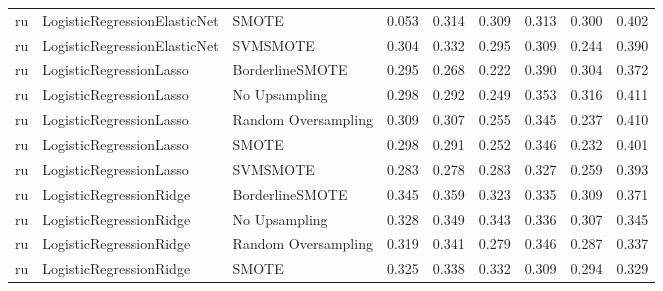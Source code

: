 \begin{tabular}{lllllllll}
      ru & LogisticRegressionElasticNet &               SMOTE & 0.053 &                     0.314 &                 0.309 &                  0.313 &                                   0.300 &     0.402 \\
      ru & LogisticRegressionElasticNet &            SVMSMOTE & 0.304 &                     0.332 &                 0.295 &                  0.309 &                                   0.244 &     0.390 \\
      ru &      LogisticRegressionLasso &     BorderlineSMOTE & 0.295 &                     0.268 &                 0.222 &                  0.390 &                                   0.304 &     0.372 \\
      ru &      LogisticRegressionLasso &       No Upsampling & 0.298 &                     0.292 &                 0.249 &                  0.353 &                                   0.316 &     0.411 \\
      ru &      LogisticRegressionLasso & Random Oversampling & 0.309 &                     0.307 &                 0.255 &                  0.345 &                                   0.237 &     0.410 \\
      ru &      LogisticRegressionLasso &               SMOTE & 0.298 &                     0.291 &                 0.252 &                  0.346 &                                   0.232 &     0.401 \\
      ru &      LogisticRegressionLasso &            SVMSMOTE & 0.283 &                     0.278 &                 0.283 &                  0.327 &                                   0.259 &     0.393 \\
      ru &      LogisticRegressionRidge &     BorderlineSMOTE & 0.345 &                     0.359 &                 0.323 &                  0.335 &                                   0.309 &     0.371 \\
      ru &      LogisticRegressionRidge &       No Upsampling & 0.328 &                     0.349 &                 0.343 &                  0.336 &                                   0.307 &     0.345 \\
      ru &      LogisticRegressionRidge & Random Oversampling & 0.319 &                     0.341 &                 0.279 &                  0.346 &                                   0.287 &     0.337 \\
      ru &      LogisticRegressionRidge &               SMOTE & 0.325 &                     0.338 &                 0.332 &                  0.309 &                                   0.294 &     0.329 \\

\end{tabular}
